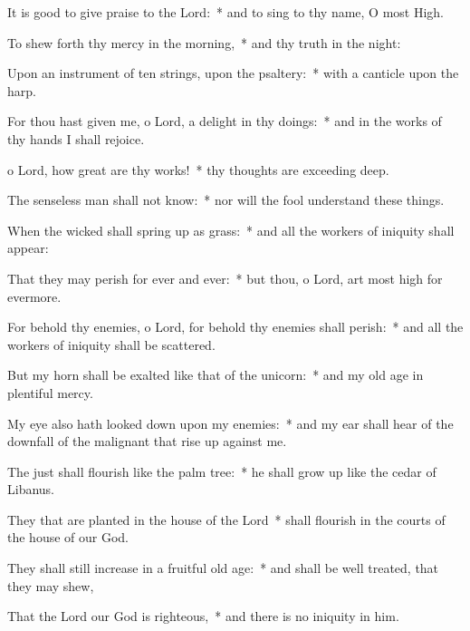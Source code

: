 \begin{enpars}
\item It is good to give praise to the Lord:~* and to sing to thy name, O most High.
\item To shew forth thy mercy in the morning,~* and thy truth in the night:
\item Upon an instrument of ten strings, upon the psaltery:~* with a canticle upon the harp.
\item For thou hast given me, o Lord, a delight in thy doings:~* and in the works of thy hands I shall rejoice.
\item o Lord, how great are thy works!~* thy thoughts are exceeding deep.
\item The senseless man shall not know:~* nor will the fool understand these things.
\item When the wicked shall spring up as grass:~* and all the workers of iniquity shall appear:
\item That they may perish for ever and ever:~* but thou, o Lord, art most high for evermore.
\item For behold thy enemies, o Lord, for behold thy enemies shall perish:~* and all the workers of iniquity shall be scattered.
\item But my horn shall be exalted like that of the unicorn:~* and my old age in plentiful mercy.
\item My eye also hath looked down upon my enemies:~* and my ear shall hear of the downfall of the malignant that rise up against me.
\item The just shall flourish like the palm tree:~* he shall grow up like the cedar of Libanus.
\item They that are planted in the house of the Lord~* shall flourish in the courts of the house of our God.
\item They shall still increase in a fruitful old age:~* and shall be well treated, that they may shew,
\item That the Lord our God is righteous,~* and there is no iniquity in him.
\end{enpars}